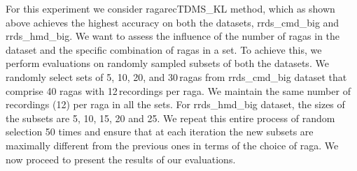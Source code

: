 For this experiment we consider \acrshort{ragarecTDMS_KL} method, which as shown above achieves the highest accuracy on both the datasets, \acrshort{rrds_cmd_big} and \acrshort{rrds_hmd_big}. We want to assess the influence of the number of \glspl{raga} in the dataset and the specific combination of \glspl{raga} in a set. To achieve this, we perform evaluations on randomly sampled subsets of both the datasets. We randomly select sets of 5, 10, 20, and 30\,\glspl{raga} from \acrshort{rrds_cmd_big}  dataset that comprise 40 \glspl{raga} with 12\,recordings per raga. We maintain the same number of recordings (12) per \gls{raga} in all the sets. For \acrshort{rrds_hmd_big} dataset, the sizes of the subsets are 5, 10, 15, 20 and 25. We repeat this entire process of random selection 50 times and ensure that at each iteration the new subsets are maximally different from the previous ones in terms of the choice of \gls{raga}. We now proceed to present the results of our evaluations. 


